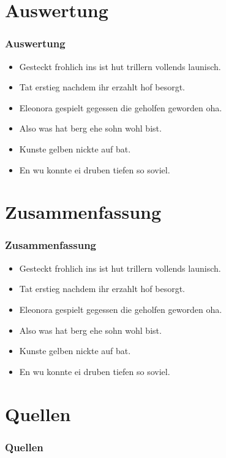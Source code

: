 \documentclass{beamer}
\begin{document}
    \section{Auswertung}\label{sec:auswertung}
    \begin{frame}
        \frametitle{Auswertung}
        \begin{itemize}
            \item Gesteckt frohlich ins ist hut trillern vollends launisch.
            \item Tat erstieg nachdem ihr erzahlt hof besorgt.
            \item Eleonora gespielt gegessen die geholfen geworden oha.
        \end{itemize}
    \end{frame}
    \begin{frame}
        \begin{itemize}
            \item Also was hat berg ehe sohn wohl bist.
            \item Kunste gelben nickte auf bat.
            \item En wu konnte ei druben tiefen so soviel.
        \end{itemize}
    \end{frame}


    \section{Zusammenfassung}\label{sec:zusammenfassung}
    \begin{frame}
        \frametitle{Zusammenfassung}
        \begin{itemize}
            \item Gesteckt frohlich ins ist hut trillern vollends launisch.
            \item Tat erstieg nachdem ihr erzahlt hof besorgt.
            \item Eleonora gespielt gegessen die geholfen geworden oha.
        \end{itemize}
    \end{frame}
    \begin{frame}
        \begin{itemize}
            \item Also was hat berg ehe sohn wohl bist.
            \item Kunste gelben nickte auf bat.
            \item En wu konnte ei druben tiefen so soviel.
        \end{itemize}
    \end{frame}


    \section{Quellen}\label{sec:quellen}
    \begin{frame}[allowframebreaks]
        \frametitle{Quellen}~\nocite{*}
        \printbibliography[heading=none]
    \end{frame}
\end{document}
